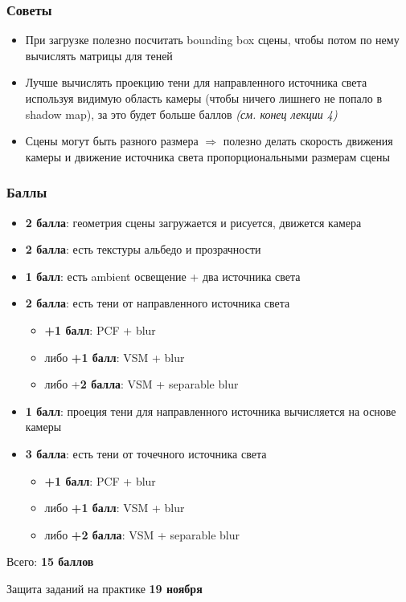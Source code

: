 \documentclass[10pt]{beamer}
\begin{document}
\begin{frame}[fragile]
\frametitle{Советы}
\begin{itemize}
\item При загрузке полезно посчитать bounding box сцены, чтобы потом по нему вычислять матрицы для теней
\item Лучше вычислять проекцию тени для направленного источника света используя видимую область камеры (чтобы ничего лишнего не попало в shadow map), за это будет больше баллов \textit{(см. конец лекции 4)}
\item Сцены могут быть разного размера \begin{math}\Rightarrow\end{math} полезно делать скорость движения камеры и движение источника света пропорциональными размерам сцены
\end{itemize}
\end{frame}

\begin{frame}[fragile]
\frametitle{Баллы}
\footnotesize
\begin{itemize}
\item \textbf{2 балла}: геометрия сцены загружается и рисуется, движется камера
\item \textbf{2 балла}: есть текстуры альбедо и прозрачности
\item \textbf{1 балл}: есть ambient освещение + два источника света
\item \textbf{2 балла}: есть тени от направленного источника света
\begin{itemize}
\item \textbf{+1 балл}: PCF + blur
\item либо \textbf{+1 балл}: VSM + blur
\item либо +\textbf{2 балла}: VSM + separable blur
\end{itemize}
\item \textbf{1 балл}: проеция тени для направленного источника вычисляется на основе камеры
\item \textbf{3 балла}: есть тени от точечного источника света
\begin{itemize}
\item \textbf{+1 балл}: PCF + blur
\item либо \textbf{+1 балл}: VSM + blur
\item либо \textbf{+2 балла}: VSM + separable blur
\end{itemize}
\end{itemize}
Всего: \textbf{15 баллов}

Защита заданий на практике \textbf{19 ноября}
\end{frame}
\end{document}
